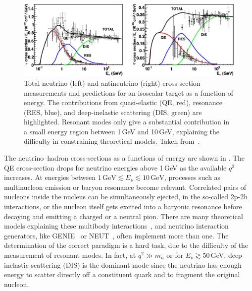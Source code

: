 \begin{figure}
	\centering
	\includegraphics[width=\textwidth]{pics/qe_xsec.pdf}
	\caption[Neutrino--nucleus cross-sections at high neutrino energies]%
	{Total neutrino (left) and antineutrino (right) cross-section measurements and predictions for an isoscalar target %
	as a function of energy. The contributions from quasi-elastic (QE, red), resonance (RES, blue), %
	and deep-inelastic scattering (DIS, green) are highlighted.
	Resonant modes only give a substantial contribution in a small energy region between 1\,GeV and 10\,GeV, %
	explaining the difficulty in constraining theoretical models.
	Taken from~.}
	\label{fig:xsec}
\end{figure}

The neutrino--hadron cross-sections as a functions of energy are shown in .
The QE cross-section drops for neutrino energies above 1\,GeV as the available $q^2$ increases. 
At energies between $1\,\text{GeV} \lesssim E_\nu \lesssim 10\,\text{GeV}$, %
processes such as multinucleon emission or baryon resonance become relevant.
Correlated pairs of nucleons inside the nucleus can be simultaneously ejected, in the so-called 2p-2h interactions, %
or the nucleon itself gets excited into a baryonic resonance before decaying and emitting a charged or a neutral pion.
There are many theoretical models explaining these multibody interactions~\cite{Rein:1980wg, Martini:2009uj, Nieves:2011pp}, %
and neutrino interaction generators, like GENIE~\cite{Andreopoulos:2009rq} or NEUT~\cite{Hayato:2002sd}, %
often implement more than one.
The determination of the correct paradigm is a hard task, due to the difficulty of the measurement of resonant modes.
In fact, at $q^2 \gg m_n$ or for $E_\nu \gtrsim 50$\,GeV, deep inelastic scattering (DIS) is the dominant mode since %
the neutrino has enough energy to scatter directly off a constituent quark and to fragment the original nucleon.
